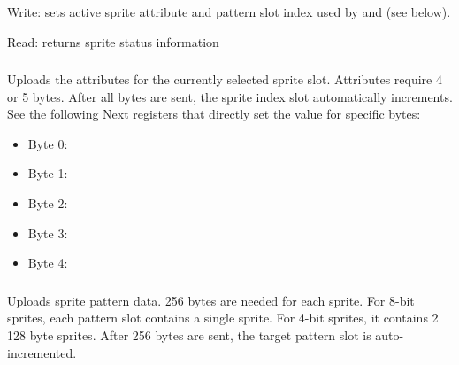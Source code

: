 Write: sets active sprite attribute and pattern slot index used by  and  (see below).

\begin{NextPort}
\end{NextPort}

Read: returns sprite status information

\begin{NextPort}
\end{NextPort}


\subsubsection{}

Uploads the attributes for the currently selected sprite slot. Attributes require 4 or 5 bytes. After all bytes are sent, the sprite index slot automatically increments. See the following Next registers that directly set the value for specific bytes:

\begin{itemize}[topsep=1pt,itemsep=1pt]
	\item Byte 0: 
	\item Byte 1: 
	\item Byte 2: 
	\item Byte 3: 
	\item Byte 4: 
\end{itemize}


\subsubsection{}

Uploads sprite pattern data. 256 bytes are needed for each sprite. For 8-bit sprites, each pattern slot contains a single sprite. For 4-bit sprites, it contains 2 128 byte sprites. After 256 bytes are sent, the target pattern slot is auto-incremented.

